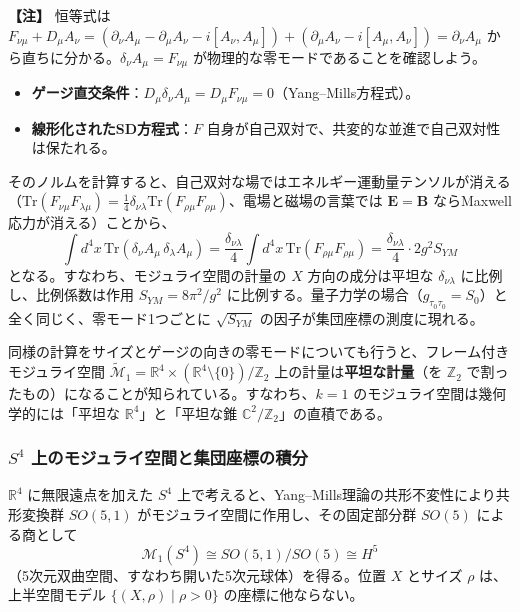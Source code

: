 \documentclass[uplatex, dvipdfmx, book]{jsbook}
\let\origsubsubsection\subsubsection
\renewcommand{\subsection}{\origsubsubsection}
\renewcommand{\subsubsection}{\paragraph}
\newenvironment{note}{\vspace{1ex}\par\footnotesize\noindent\textbf{【注】}}{\par\vspace{1ex}}
\begin{document}
\begin{note}
恒等式は $F_{\nu\mu} + D_\mu A_\nu = (\partial_\nu A_\mu - \partial_\mu A_\nu - i[A_\nu, A_\mu]) + (\partial_\mu A_\nu - i[A_\mu, A_\nu]) = \partial_\nu A_\mu$ から直ちに分かる。$\delta_\nu A_\mu = F_{\nu\mu}$ が物理的な零モードであることを確認しよう。
\begin{itemize}
    \item \textbf{ゲージ直交条件}：$D_\mu \delta_\nu A_\mu = D_\mu F_{\nu\mu} = 0$（Yang--Mills方程式）。
    \item \textbf{線形化されたSD方程式}：$F$ 自身が自己双対で、共変的な並進で自己双対性は保たれる。
\end{itemize}
そのノルムを計算すると、自己双対な場ではエネルギー運動量テンソルが消える（$\mathrm{Tr}(F_{\nu\mu}F_{\lambda\mu}) = \frac{1}{4}\delta_{\nu\lambda}\mathrm{Tr}(F_{\rho\mu}F_{\rho\mu})$、電場と磁場の言葉では $\bm{E} = \bm{B}$ ならMaxwell応力が消える）ことから、
\begin{equation*}
    \int d^4x\, \mathrm{Tr}(\delta_\nu A_\mu\,\delta_\lambda A_\mu) = \frac{\delta_{\nu\lambda}}{4}\int d^4x\, \mathrm{Tr}(F_{\rho\mu}F_{\rho\mu}) = \frac{\delta_{\nu\lambda}}{4} \cdot 2g^2 S_{YM}
\end{equation*}
となる。すなわち、モジュライ空間の計量の $X$ 方向の成分は平坦な $\delta_{\nu\lambda}$ に比例し、比例係数は作用 $S_{YM} = 8\pi^2/g^2$ に比例する。量子力学の場合（$g_{\tau_0\tau_0} = S_0$）と全く同じく、零モード1つごとに $\sqrt{S_{YM}}$ の因子が集団座標の測度に現れる。
\end{note}

同様の計算をサイズとゲージの向きの零モードについても行うと、フレーム付きモジュライ空間 $\widetilde{\mathcal{M}}_1 = \mathbb{R}^4 \times (\mathbb{R}^4\setminus\{0\})/\mathbb{Z}_2$ 上の計量は\textbf{平坦な計量}（を $\mathbb{Z}_2$ で割ったもの）になることが知られている。すなわち、$k=1$ のモジュライ空間は幾何学的には「平坦な $\mathbb{R}^4$」と「平坦な錐 $\mathbb{C}^2/\mathbb{Z}_2$」の直積である。

\subsection{$S^4$ 上のモジュライ空間と集団座標の積分}

$\mathbb{R}^4$ に無限遠点を加えた $S^4$ 上で考えると、Yang--Mills理論の共形不変性により共形変換群 $SO(5,1)$ がモジュライ空間に作用し、その固定部分群 $SO(5)$ による商として
\begin{equation}
    \mathcal{M}_1(S^4) \cong SO(5,1)/SO(5) \cong H^5
\end{equation}
（5次元双曲空間、すなわち開いた5次元球体）を得る。位置 $X$ とサイズ $\rho$ は、上半空間モデル $\{(X, \rho) \mid \rho > 0\}$ の座標に他ならない。
\end{document}
